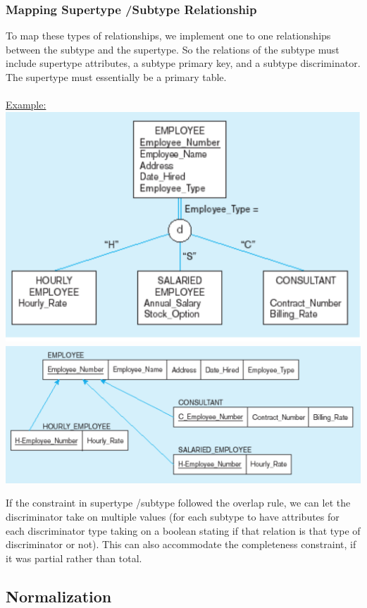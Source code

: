 \documentclass[12pt]{article}
\begin{document}
\subsubsection{Mapping Supertype \slash  Subtype Relationship}

To map these types of relationships, we implement one to one relationships between the subtype and the supertype. So the relations of the subtype must include supertype attributes, a subtype primary key, and a subtype discriminator. The supertype must essentially be a primary table.\\
\\
\underline{Example:}\\
\includegraphics[scale=0.7]{lec5-2}\\
\includegraphics[scale=0.6]{lec5-3}

If the constraint in supertype \slash  subtype followed the overlap rule, we can let the discriminator take on multiple values (for each subtype to have attributes for each discriminator type taking on a boolean stating if that relation is that type of discriminator or not). This can also accommodate the completeness constraint, if it was partial rather than total.

\subsection{Normalization}
\end{document}
